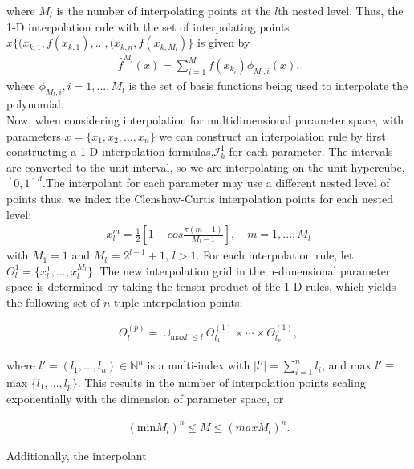 \documentclass{article}
\begin{document}
where $M_l$ is the number of interpolating points at the $l$th nested level. Thus, the 1-D interpolation rule  with the set  of interpolating points $x\{(x_{k,1},f(x_{k,1}), ..., (x_{k,n}, f(x_{k,M_l})\}$ is given by
\begin{align*}
\hat{f}^{M_l}(x) = \sum_{i=1}^{M_l}f(x_{k_i})\phi_{M_l,i}(x ).
\end{align*}
where $\phi_{M_l,i}, i = 1,..., M_l$ is the set of basis functions being used to interpolate the polynomial.\\
Now, when considering interpolation for multidimensional parameter space, with parameters $x = \{x_1, x_2,..., x_n\}$ we can construct an interpolation rule by first constructing a 1-D interpolation formulas,$\mathcal{I}_k^{1}$ for each parameter. 
The intervals are converted to the unit interval, so we are interpolating on the unit hypercube, $[0,1]^d$.The interpolant for each parameter may use a different nested level of points thus, we index the Clenshaw-Curtis interpolation points for each nested level:
\begin{align*}
x_l^m = \frac{1}{2}[1-cos\frac{\pi(m-1)}{M_l-1}], \quad m = 1,...,M_l 
\end{align*}
 with $M_1 = 1$ and $M_l$ = $2^{l-1} + 1$, $l>1$. \cite{R_Smith}
For each interpolation rule, let $\Theta_l^{1} = \{x_l^1,...,x_l^{M_l}\}$. The new interpolation grid in the n-dimensional parameter space is determined by taking the tensor product of the 1-D rules, which yields the following set of $n$-tuple interpolation points:

\begin{align*}
\Theta_l^{(p)} = \cup_{\text{max} l' \le l} \Theta_{l_1}^{(1)} \times \cdots \times \Theta_{l_p}^{(1)},
\end{align*} 

where $l' = (l_1,...,l_n) \in \mathbb{N}^n$ is a multi-index with $|l'| = \sum_{i=1}^n l_i$, and  max $ l' \equiv$  max $ \{l_1,...,l_p\}$. This results in the number of interpolation points scaling exponentially with the dimension of parameter space, or

\begin{align*}
(\text{min} M_l)^n \le M \le (max M_l)^n.
\end{align*}

\noindent

Additionally, the interpolant
\end{document}
